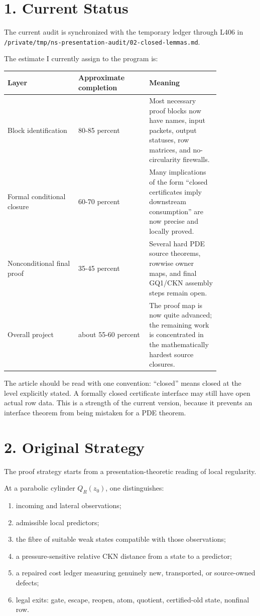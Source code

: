 \documentclass[11pt]{article}
\begin{document}
\section*{1. Current Status}

The current audit is synchronized with the temporary ledger through L406 in \texttt{/private/tmp/ns-presentation-audit/02-closed-lemmas.md}.

The estimate I currently assign to the program is:

\begin{tabular}{p{0.28\linewidth}|p{0.28\linewidth}|p{0.28\linewidth}}
Layer & Approximate completion & Meaning \\
\hline
Block identification & 80-85 percent & Most necessary proof blocks now have names, input packets, output statuses, row matrices, and no-circularity firewalls. \\
Formal conditional closure & 60-70 percent & Many implications of the form ``closed certificates imply downstream consumption'' are now precise and locally proved. \\
Nonconditional final proof & 35-45 percent & Several hard PDE source theorems, rowwise owner maps, and final GQ1/CKN assembly steps remain open. \\
Overall project & about 55-60 percent & The proof map is now quite advanced; the remaining work is concentrated in the mathematically hardest source closures. \\
\end{tabular}

The article should be read with one convention: ``closed'' means closed at the level explicitly stated. A formally closed certificate interface may still have open actual row data. This is a strength of the current version, because it prevents an interface theorem from being mistaken for a PDE theorem.

\section*{2. Original Strategy}

The proof strategy starts from a presentation-theoretic reading of local regularity.

At a parabolic cylinder \(Q_R(z_0)\), one distinguishes:

\begin{enumerate}
\item
  incoming and lateral observations;
\item
  admissible local predictors;
\item
  the fibre of suitable weak states compatible with those observations;
\item
  a pressure-sensitive relative CKN distance from a state to a predictor;
\item
  a repaired cost ledger measuring genuinely new, transported, or source-owned defects;
\item
  legal exits: gate, escape, reopen, atom, quotient, certified-old state, nonfinal row.
\end{enumerate}
\end{document}
